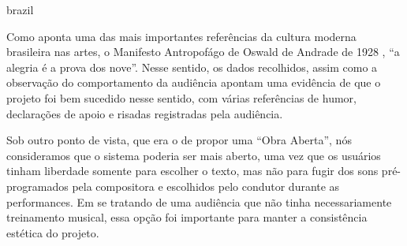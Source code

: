 \begin{otherlanguage*}{brazil}

Como aponta uma das mais importantes referências da cultura moderna brasileira nas artes, o Manifesto Antropofágo de Oswald de Andrade de 1928 \cite{Andrade1928}, ``a alegria é a prova dos nove''. Nesse sentido, os dados recolhidos, assim como a observação do comportamento da audiência apontam uma evidência de que o projeto foi bem sucedido nesse sentido, com várias referências de humor, declarações de apoio e risadas registradas pela audiência. 


Sob outro ponto de vista, que era o de propor uma ``Obra Aberta'', nós consideramos que o sistema poderia ser mais aberto, uma vez que os usuários tinham liberdade somente para escolher o texto, mas não para fugir dos sons pré-programados pela compositora e escolhidos pelo condutor durante as performances. Em se tratando de uma audiência que não tinha necessariamente treinamento musical, essa opção foi importante para manter a consistência estética do projeto.





\end{otherlanguage*}
